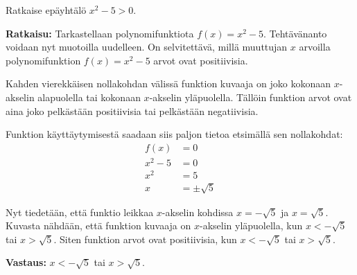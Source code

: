 \begin{esimerkki}
Ratkaise epäyhtälö $x^2-5>0$.

\textbf{Ratkaisu:}
Tarkastellaan polynomifunktiota $f(x)=x^2-5$. Tehtävänanto voidaan nyt muotoilla uudelleen. On selvitettävä, millä muuttujan $x$ arvoilla polynomifunktion $f(x)=x^2-5$ arvot ovat positiivisia.

\begin{kuvaajapohja}[\kuvaajaAsetusEiRuudukkoa\kuvaajaAsetusEiLukuja]{0.6}{-5}{5}{-6}{5}
\end{kuvaajapohja}


Kahden vierekkäisen nollakohdan välissä funktion kuvaaja on joko kokonaan $x$-akselin alapuolella tai kokonaan $x$-akselin yläpuolella. Tällöin funktion arvot ovat aina joko pelkästään positiivisia tai pelkästään negatiivisia.

Funktion käyttäytymisestä saadaan siis paljon tietoa etsimällä sen nollakohdat:
\begin{align*}
f(x)&=0 \\
x^2-5&=0 \\
x^2&=5 \\
x&=\pm \sqrt{5}
\end{align*}

Nyt tiedetään, että funktio leikkaa $x$-akselin kohdissa $x=-\sqrt{5}$ ja $x=\sqrt{5}$. Kuvasta nähdään, että funktion kuvaaja on $x$-akselin yläpuolella, kun $x<-\sqrt{5}$ tai $x>\sqrt{5}$. Siten funktion arvot ovat positiivisia, kun $x<-\sqrt{5}$ tai $x>\sqrt{5}$.

\begin{lukusuora}{-2.5}{2.5}{5}
\end{lukusuora}

\textbf{Vastaus:} $x<-\sqrt{5}$ tai $x>\sqrt{5}$.

\end{esimerkki}

